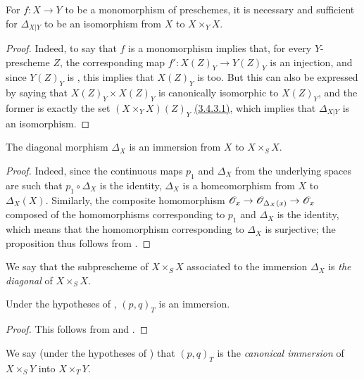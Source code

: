 \begin{prop}[5.3.8]
\label{1.5.3.8}
For $f:X\to Y$ to be a monomorphism of preschemes, it is necessary and sufficient for $\Delta_{X|Y}$ to be an isomorphism from $X$ to $X\times_Y X$.
\end{prop}

\begin{proof}
\label{1.5.3.8}
Indeed, to say that $f$ is a monomorphism implies that, for every $Y$-prescheme $Z$, the corresponding map $f':X(Z)_Y\to Y(Z)_Y$ is an injection, and since $Y(Z)_Y$ is , this implies that $X(Z)_Y$ is too.
But this can also be expressed by saying that $X(Z)_Y\times X(Z)_Y$ is canonically isomorphic to $X(Z)_Y$, and the former is exactly the set $(X\times_Y X)(Z)_Y$ \hyperref[1.3.4.3]{(3.4.3.1)}, which implies that $\Delta_{X|Y}$ is an isomorphism.
\end{proof}

\begin{prop}[5.3.9]
\label{1.5.3.9}
The diagonal morphism $\Delta_X$ is an immersion from $X$ to $X\times_S X$.
\end{prop}

\begin{proof}
\label{proof-1.5.3.9}
Indeed, since the continuous maps $p_1$ and $\Delta_X$ from the underlying spaces are such that $p_1\circ\Delta_X$ is the identity, $\Delta_X$ is a homeomorphism from $X$ to $\Delta_X(X)$.
Similarly, the composite homomorphism $\OO_x\to\OO_{\Delta_X(x)}\to\OO_x$ composed of the homomorphisms corresponding to $p_1$ and $\Delta_X$ is the identity, which means that the homomorphism corresponding to $\Delta_X$ is surjective;
the proposition thus follows from .
\end{proof}

We say that the subprescheme of $X\times_S X$ associated to the immersion $\Delta_X$  is \emph{the diagonal} of $X\times_S X$.

\begin{cor}[5.3.10]
\label{1.5.3.10}
Under the hypotheses of , $(p,q)_T$ is an immersion.
\end{cor}

\begin{proof}
\label{proof-1.5.3.10}
This follows from  and .
\end{proof}

We say (under the hypotheses of ) that $(p,q)_T$ is the \emph{canonical immersion} of $X\times_S Y$ into $X\times_T Y$.

